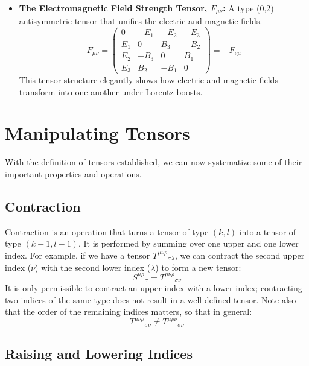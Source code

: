 \documentclass[11pt, a4paper]{report}
\begin{document}
\begin{itemize}
    \item \textbf{The Electromagnetic Field Strength Tensor, $F_{\mu\nu}$:} A type (0,2) antisymmetric tensor that unifies the electric and magnetic fields.
    \begin{equation}\label{eq:EM Field Tensor}
        F_{\mu\nu} =
        \begin{pmatrix}
            0 & -E_1 & -E_2 & -E_3 \\
            E_1 & 0 & B_3 & -B_2 \\
            E_2 & -B_3 & 0 & B_1 \\
            E_3 & B_2 & -B_1 & 0
        \end{pmatrix}
        = -F_{\nu\mu}
    \end{equation}
    This tensor structure elegantly shows how electric and magnetic fields transform into one another under Lorentz boosts.
\end{itemize}
\section{Manipulating Tensors}

With the definition of tensors established, we can now systematize some of their important properties and operations.

\subsection*{Contraction}

Contraction is an operation that turns a tensor of type $(k, l)$ into a tensor of type $(k-1, l-1)$. It is performed by summing over one upper and one lower index. For example, if we have a tensor ${T^{\mu\nu\rho}}_{\sigma\lambda}$, we can contract the second upper index ($\nu$) with the second lower index ($\lambda$) to form a new tensor:
\begin{equation}
    {S^{\mu\rho}}_\sigma = {T^{\mu\nu\rho}}_{\sigma\nu}
\end{equation}
It is only permissible to contract an upper index with a lower index; contracting two indices of the same type does not result in a well-defined tensor. Note also that the order of the remaining indices matters, so that in general:
\begin{equation}
    {T^{\mu\nu\rho}}_{\sigma\nu} \ne {T^{\mu\rho\nu}}_{\sigma\nu}
\end{equation}

\subsection*{Raising and Lowering Indices}
\end{document}
